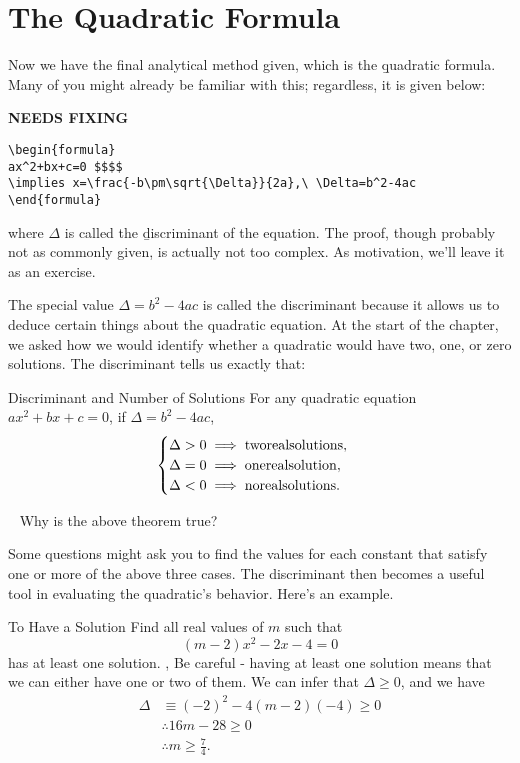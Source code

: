 \documentclass[../../main.tex]{subfiles}
\begin{document}
\section{The Quadratic Formula}
Now we have the final analytical method given, which is the \b{quadratic formula}. Many of you might already be familiar with this; regardless, it is given below:

{\hfill\Large\bfseries NEEDS FIXING\hfill}
\begin{lstlisting}
\begin{formula}
ax^2+bx+c=0 $$$$
\implies x=\frac{-b\pm\sqrt{\Delta}}{2a},\ \Delta=b^2-4ac
\end{formula}
 \end{lstlisting}
where $\Delta$ is called the \b{discriminant} of the equation. The proof, though probably not as commonly given, is actually not too complex. As motivation, we'll leave it as an exercise.

The special value $\Delta=b^2-4ac$ is called the discriminant because it allows us to deduce certain things about the quadratic equation. At the start of the chapter, we asked how we would identify whether a quadratic would have two, one, or zero solutions. The discriminant tells us exactly that:

\begin{theorem}{Discriminant and Number of Solutions}
For any quadratic equation $ax^2+bx+c=0$, if $\Delta=b^2-4ac$,
$$\begin{cases}
    \Delta>0\implies\rm{two real solutions,} \\
    \Delta=0\implies\rm{one real solution,} \\
    \Delta<0\implies\rm{no real solutions.}
\end{cases}$$
\end{theorem}
\begin{thinking}{~}
Why is the above theorem true?
\end{thinking}
Some questions might ask you to find the values for each constant that satisfy one or more of the above three cases. The discriminant then becomes a useful tool in evaluating the quadratic's behavior. Here's an example.
\begin{example}{To Have a Solution}
Find all real values of $m$ such that $$(m-2)x^2-2x-4=0$$ has at least one solution.
\sep
Be careful - having at least one solution means that we can either have one or two of them. We can infer that $\Delta\geq0$, and we have
\begin{align}
    \Delta&\equiv(-2)^2-4(m-2)(-4)\geq0 \\
    &\therefore16m-28\geq0 \\
    &\therefore m\geq\frac74.
\end{align}
\end{example}
\end{document}
